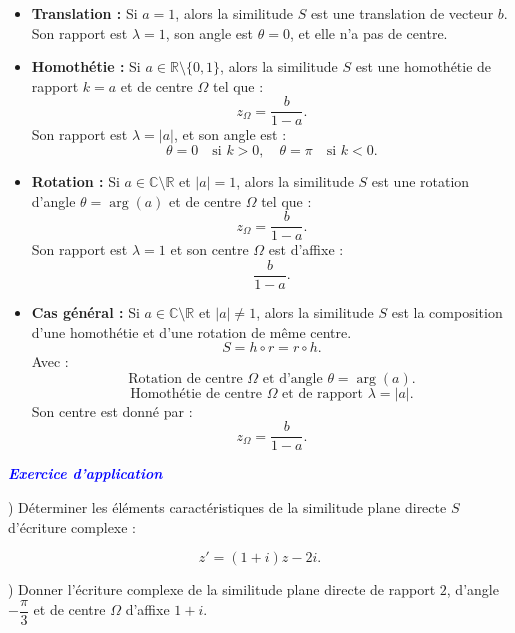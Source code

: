 \documentclass{article}
\begin{document}
\begin{itemize}
    \item \textbf{Translation :} Si \( a = 1 \), alors la similitude \( S \) est une translation de vecteur \( b \). 
    Son rapport est \( \lambda = 1 \), son angle est \( \theta = 0 \), et elle n’a pas de centre.

    \item \textbf{Homothétie :} Si \( a \in \mathbb{R} \setminus \{0,1\} \), alors la similitude \( S \) est une homothétie de rapport \( k = a \) et de centre \( \Omega \) tel que :
    \[
    z_{\Omega} = \frac{b}{1 - a}.
    \]
    Son rapport est \( \lambda = |a| \), et son angle est :
    \[
    \theta = 0 \quad \text{si } k > 0, \quad \theta = \pi \quad \text{si } k < 0.
    \]

    \item \textbf{Rotation :} Si \( a \in \mathbb{C} \setminus \mathbb{R} \) et \( |a| = 1 \), alors la similitude \( S \) est une rotation d’angle \( \theta = \arg(a) \) et de centre \( \Omega \) tel que :
    \[
    z_{\Omega} = \frac{b}{1 - a}.
    \]
    Son rapport est \( \lambda = 1 \) et son centre \( \Omega \) est d’affixe :
    \[
    \frac{b}{1 - a}.
    \]

    \item \textbf{Cas général :} Si \( a \in \mathbb{C} \setminus \mathbb{R} \) et \( |a| \neq 1 \), alors la similitude \( S \) est la composition d’une homothétie et d’une rotation de même centre.
    \[
    S = h \circ r = r \circ h.
    \]
    Avec :
    \[
    \text{Rotation de centre } \Omega \text{ et d’angle } \theta = \arg(a).
    \]
    \[
    \text{Homothétie de centre } \Omega \text{ et de rapport } \lambda = |a|.
    \]
    Son centre est donné par :
    \[
    z_{\Omega} = \frac{b}{1 - a}.
    \]
\end{itemize}

\textbf{\textcolor{blue}{\textit{Exercice d’application}}}

\vspace{0.3cm}

) Déterminer les éléments caractéristiques de la similitude plane directe \( S \) d’écriture complexe :

\[
z' = (1 + i) z - 2i.
\]

\vspace{0.3cm}

) Donner l’écriture complexe de la similitude plane directe de rapport \( 2 \), d’angle \( -\dfrac{\pi}{3} \) et de centre \( \Omega \) d’affixe \( 1 + i \).
\end{document}
